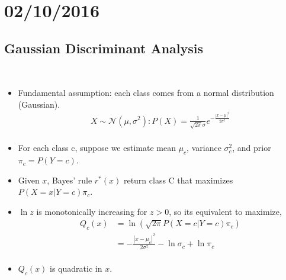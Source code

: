 \documentclass[10pt]{article}
\begin{document}
\section*{02/10/2016}
	\subsection*{Gaussian Discriminant Analysis}
		\
		\begin{itemize}
			\item Fundamental assumption: each class comes from a normal distribution (Gaussian).
				\begin{align*}
					X \sim \mathcal{N}(\mu, \sigma^{2}):
					P(X) = \frac{1}{\sqrt{2\pi}\sigma} e^{-\frac{|x-\mu|^{2}}{2\sigma^{2}}}\\ 
				\end{align*}
			\item For each class c, suppose we estimate mean $\mu_{c}$, variance $\sigma_{c}^{2}$, and prior $\pi_{c} = P(Y=c)$.
			\item Given $x$, Bayes' rule $r^{*}(x)$ return class C that maximizes $P(X=x|Y=c)\pi_{c}$.
			\item $\ln z$ is monotonically increasing for $z > 0$, so its equivalent to maximize,
				\begin{align*}
					Q_{c}(x) &= \ln(\sqrt{2\pi}P(X=c|Y=c)\pi_{c})\\
							&= -\frac{|x-\mu_{c}|^{2}}{2\sigma^{2}} - \ln \sigma_{c} + \ln \pi_{c}\\
				\end{align*}
			\item $Q_{c}(x)$ is quadratic in $x$.
		\end{itemize}
	
\end{document}
